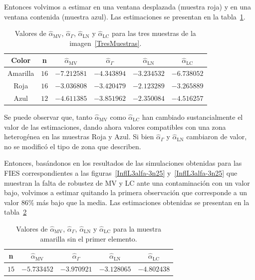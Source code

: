 Entonces volvimos a estimar en una ventana desplazada (muestra roja) y en una ventana contenida (muestra azul). Las estimaciones se presentan en la tabla~\ref{TablaTresMuestras}.
\begin{table}[htb]
	\centering
	\caption{\label{TablaTresMuestras} Valores de $\widehat{\alpha}_{\text{MV}}$, $\widehat{\alpha}_{\Gamma}$, $\widehat{\alpha}_{\text{LN}}$ y $\widehat{\alpha}_{\text{LC}}$ para las tres muestras de la imagen~\ref{TresMuestras}.}
	\begin{tabular}{c*5{c}}
		\toprule
		Color       &  n    &  $\widehat{\alpha}_{\text{MV}}$    &  $\widehat{\alpha}_{\Gamma}$  &  $\widehat{\alpha}_{\text{LN}}$ &  $\widehat{\alpha}_{\text{LC}}$\\
		\midrule
		Amarilla    & $16$  & $-7.212581$ & $-4.343894$ & $-3.234532$ & $-6.738052$\\
		Roja        & $16$  & $-3.036808$ & $-3.420479$ & $-2.123289$ & $-3.265889$\\
		Azul        & $12$  & $-4.611385$ & $-3.851962$ & $-2.350084$ & $-4.516257$\\
		\bottomrule
	\end{tabular}
\end{table}

Se puede observar que, tanto $\widehat{\alpha}_{\text{MV}}$ como $\widehat{\alpha}_{\text{LC}}$ han cambiado sustancialmente el valor de las estimaciones, dando ahora valores compatibles con una zona heterogénea en las muestras Roja y Azul. Si bien $\widehat{\alpha}_{\Gamma}$ y $\widehat{\alpha}_{\text{LN}}$ cambiaron de valor, no se modificó el tipo de zona que describen. 

Entonces, basándonos en los resultados de las simulaciones obtenidas para las FIES correspondientes a las figuras~\ref{InflL3alfa-3n25} y~\ref{InflL3alfa-3n25} que muestran la falta de robustez de MV y LC ante una contaminación con un valor bajo, volvimos a estimar quitando la primera observación que corresponde a un valor $86\%$ más bajo que la media. Las estimaciones obtenidas se presentan en la tabla~\ref{SinPrimero}
\begin{table}[htb]
	\centering
	\caption{\label{SinPrimero} Valores de $\widehat{\alpha}_{\text{MV}}$, $\widehat{\alpha}_{\Gamma}$, $\widehat{\alpha}_{\text{LN}}$ y $\widehat{\alpha}_{\text{LC}}$ para la muestra amarilla sin el primer elemento.}
	\begin{tabular}{c*4{c}}
		\toprule
		                n    &  $\widehat{\alpha}_{\text{MV}}$    &  $\widehat{\alpha}_{\Gamma}$  &  $\widehat{\alpha}_{\text{LN}}$ &  $\widehat{\alpha}_{\text{LC}}$\\
		\midrule
		               $15$  & $-5.733452$   & $-3.970921$    & $-3.128065$    & $-4.802438$\\
		\bottomrule
	\end{tabular}
\end{table}
 
